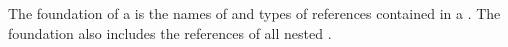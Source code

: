 \item[Foundation]{The foundation of a \gdcase is the names of and types of references contained in a \gdcase{}. The foundation also includes the references of all nested \gdcases{}.  
}
